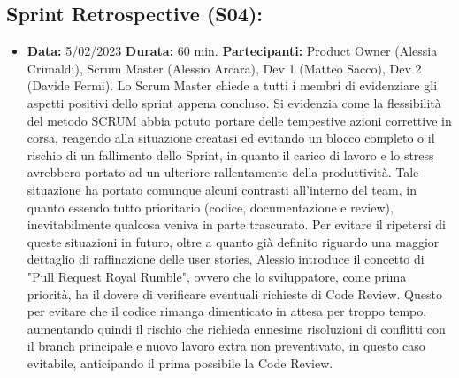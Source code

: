 \documentclass[a4paper, oneside]{article}
\newcommand\quattro{Scrum Master (Alessio Arcara), Dev 1 (Matteo Sacco), Dev 2 (Davide Fermi).}
\newcommand\quattroP{Product Owner (Alessia Crimaldi), }
\begin{document}
\begin{landscape}
        \subsection{Sprint Retrospective (S04):}
        \begin{itemize}
            \item \textbf{Data:} 5/02/2023
            \newline \textbf{Durata:} 60 min.
            \newline \textbf{Partecipanti:} \quattroP \quattro
            \newline
            \newline  Lo Scrum Master chiede a tutti i membri di evidenziare gli aspetti positivi dello sprint appena concluso. Si evidenzia come la flessibilità del metodo SCRUM abbia potuto portare delle tempestive azioni correttive in corsa, reagendo alla situazione creatasi ed evitando un blocco completo o il rischio di un fallimento dello Sprint, in quanto il carico di lavoro e lo stress avrebbero portato ad un ulteriore rallentamento della produttività.
            \newline Tale situazione ha portato comunque alcuni contrasti all'interno del team, in quanto essendo tutto prioritario (codice, documentazione e review), inevitabilmente qualcosa veniva in parte trascurato.
            Per evitare il ripetersi di queste situazioni in futuro, oltre a quanto già definito riguardo una maggior dettaglio di raffinazione delle user stories, Alessio introduce il concetto di "Pull Request Royal Rumble", ovvero che lo sviluppatore, come prima priorità, ha il dovere di verificare eventuali richieste di Code Review. Questo per evitare che il codice rimanga dimenticato in attesa per troppo tempo, aumentando quindi il rischio che richieda ennesime risoluzioni di conflitti con il branch principale e nuovo lavoro extra non preventivato, in questo caso evitabile, anticipando il prima possibile la Code Review.
        \end{itemize}

        \newpage

\end{landscape}
\end{document}

